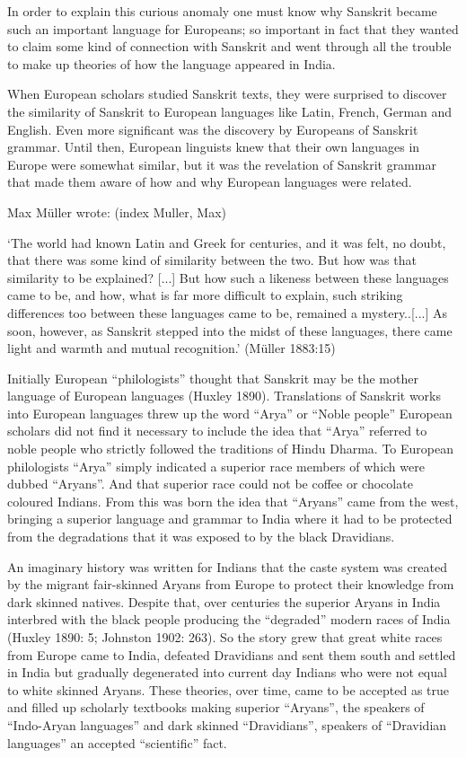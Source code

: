 In order to explain this curious anomaly one must know why Sanskrit became such an important language for Europeans; so important in fact that they wanted to claim some kind of connection with Sanskrit and went through all the trouble to make up theories of how the language appeared in India.

When European scholars studied Sanskrit texts, they were surprised to discover the similarity of Sanskrit to European languages like Latin, French, German and English. Even more significant was the discovery by Europeans of Sanskrit grammar. Until then, European linguists knew that their own languages in Europe were somewhat similar, but it was the revelation of Sanskrit grammar that made them aware of how and why European languages were related.

Max Müller wrote: (index Muller, Max)

\begin{myquote}
‘The world had known Latin and Greek for centuries, and it was felt, no doubt, that there was some kind of similarity between the two. But how was that similarity to be explained? [...] But how such a likeness between these languages came to be, and how, what is far more difficult to explain, such striking differences too between these languages came to be, remained a mystery..[...] As soon, however, as Sanskrit stepped into the midst of these languages, there came light and warmth and mutual recognition.’ (Müller 1883:15)
\end{myquote}

Initially European “philologists” thought that Sanskrit may be the mother language of European languages (Huxley 1890). Translations of Sanskrit works into European languages threw up the word “Arya” or “Noble people” European scholars did not find it necessary to include the idea that “Arya” referred to noble people who strictly followed the traditions of Hindu Dharma. To European philologists “Arya” simply indicated a superior race members of which were dubbed “Aryans”. And that superior race could not be coffee or chocolate coloured Indians. From this was born the idea that “Aryans” came from the west, bringing a superior language and grammar to India where it had to be protected from the degradations that it was exposed to by the black Dravidians. 

An imaginary history was written for Indians that the caste system was created by the migrant fair-skinned Aryans from Europe to protect their knowledge from dark skinned natives. Despite that, over centuries the superior Aryans in India interbred with the black people producing the “degraded” modern races of India (Huxley 1890: 5; Johnston 1902: 263). So the story grew that great white races from Europe came to India, defeated Dravidians and sent them south and settled in India but gradually degenerated into current day Indians who were not equal to white skinned Aryans. These theories, over time, came to be accepted as true and filled up scholarly textbooks making superior “Aryans”, the speakers of “Indo-Aryan languages” and dark skinned “Dravidians”, speakers of “Dravidian languages” an accepted “scientific” fact.

